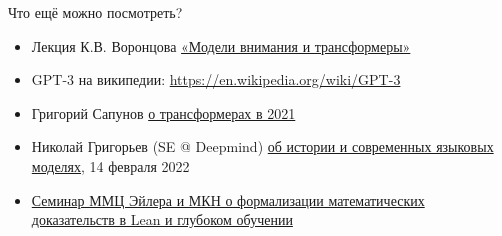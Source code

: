 \documentclass[fullscreen=true, bookmarks=true, hyperref={pdfencoding=unicode}]{beamer}
\begin{document}
\begin{frame}
  Что ещё можно посмотреть?
  \begin{itemize}
    \item Лекция К.В. Воронцова \href{https://www.youtube.com/watch?v=KhMweP00S44}{«Модели внимания и трансформеры»}
    \item GPT-3 на википедии: \href{https://en.wikipedia.org/wiki/GPT-3}{https://en.wikipedia.org/wiki/GPT-3}
    \item Григорий Сапунов \href{https://www.youtube.com/watch?v=8dN6ZVnDArk&t}{о трансформерах в 2021}
    \item Николай Григорьев (SE @ Deepmind) \href{https://www.youtube.com/watch?v=8Q-a6-P6Eyo}{об истории и современных языковых моделях}, 14 февраля 2022
    \item \href{https://disk.yandex.ru/d/knoQ44wLmGDwwQ}{Семинар ММЦ Эйлера и МКН о формализации математических доказательств в Lean и глубоком обучении}
  \end{itemize}
\end{frame}
\end{document}
